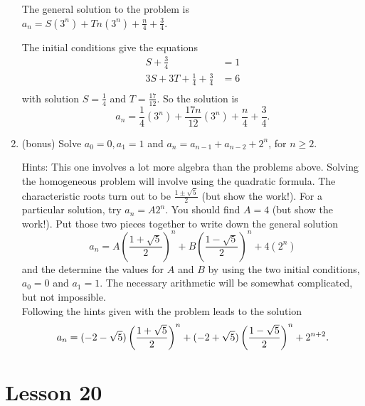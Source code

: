 \documentclass[11pt]{amsart}
\begin{document}
\begin{enumerate}
{The general solution to the problem is\\
 $\displaystyle a_n = S(3^n) + Tn(3^n) + \frac{n}{4} + \frac{3}{4}$.

The initial conditions give the equations
\begin{align*}
S + \frac{3}{4} & = 1\\[3pt]
3S + 3T +\frac{1}{4} + \frac{3}{4} & = 6\\[3pt]
\end{align*}
with solution $\displaystyle S = \frac{1}{4}$ and $\displaystyle T = \frac{17}{12}$. So the solution is 
\[
a_n = \frac{1}{4}(3^n) + \frac {17n}{12}(3^n) + \frac{n}{4} + \frac{3}{4}.
\]
}

\vfill\break

\item  (bonus)
Solve $a_0=0, a_1=1$ and $a_n=a_{n-1}+a_{n-2}+2^n$, for $n\geq 2$.

Hints: This one involves a lot more algebra than the problems above. Solving 
the homogeneous problem will involve using the quadratic formula. 
The characteristic roots turn out to be $\displaystyle \frac{1\pm \sqrt{5}}{2}$ (but show the work!). For a particular solution, try 
$a_n = A2^n$. You should find $A=4$ (but show the work!).  Put those two pieces together to write down the general solution 
\[ 
a_n = A\left(\frac{1+\sqrt{5}}{2}\right)^n + B\left(\frac{1-\sqrt{5}}{2}\right)^n + 4(2^n)
\]
and the determine the values for $A$ and $B$ by using the two initial conditions, 
$a_0 = 0$ and $a_1 = 1$. The necessary arithmetic will be somewhat complicated, but not impossible. \\[3pt]
{\color{blue}
Following the hints given with the problem leads to the solution
\[
a_n = (-2-\sqrt{5})\left(\frac{1+\sqrt{5}}{2}\right)^n + (-2+\sqrt{5})\left(\frac{1-\sqrt{5}}{2}\right)^n + 2^{n+2}.\\[5pt]
\]
}
\end{enumerate}


\section{Lesson 20}
\end{document}
